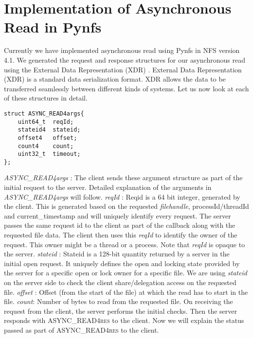 \section{Implementation of Asynchronous Read in Pynfs}

Currently we have implemented asynchronous read using Pynfs in NFS version 4.1. We generated the request and response structures for our asynchronous read using the External Data Representation (XDR) \cite{XDR}. External Data Representation (XDR) is a standard data serialization format. XDR allows the data to be transferred seamlessly between different kinds of systems. Let us now look at each of these structures in detail.

\begin{lstlisting}
struct ASYNC_READ4args{
	uint64_t  reqId; 
	stateid4  stateid; 
	offset4	  offset; 
	count4	  count;
	uint32_t  timeout; 
};
\end{lstlisting}

\noindent\textit{ASYNC\_READ4args} : The client sends these argument structure as part of the initial request to the server. Detailed explanation of the arguments in \textit{ASYNC\_READ4args} will follow. 
\hfill \break \newline
\noindent\textit{reqId} : Reqid is a 64 bit integer, generated by the client. This is generated based on the requested \textit{filehandle}, processId/threadId and current\_timestamp and will uniquely identify every request. The server passes the same request id to the client as part of the callback along with the requested file data. The client then uses this  \textit{reqId} to identify the owner of the request. This owner might be a thread or a process. Note that \textit{reqId} is opaque to the server.
\hfill \break \newline
\noindent\textit{stateid} : Stateid is a 128-bit quantity returned by a server in the initial open request. It uniquely defines the open and locking state provided by the server for a specific open or lock owner for a specific file. We are using \textit{stateid} on the server side to check the client share/delegation access on the requested file. 
\hfill \break \newline
\noindent\textit{offset} : Offset (from the start of the file) at which the read has to start in the file. 
\hfill \break \newline
\noindent\textit{count}: Number of bytes to read from the requested file.
\hfill \break \newline
\noindent On receiving the request from the client, the server performs the initial checks. Then the server responds with \textsc{ASYNC\_READ4res} to the client. Now we will explain the status passed as part of \textsc{ASYNC\_READ4res} to the client.  

